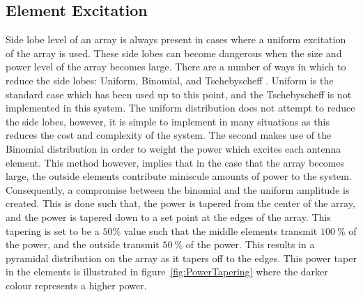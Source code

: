 \documentclass[11pt]{witseiepaper}
\begin{document}
\subsection{Element Excitation} \label{sec:ElementExcitation}
Side lobe level of an array is always present in cases where a uniform excitation of the array is used. These side lobes can become dangerous when the size and power level of the array becomes large.
There are a number of ways in which to reduce the side lobes: Uniform, Binomial, and Tschebyscheff \cite[p.~324-325]{Balanis}. Uniform is the standard case which has been used up to this point, and the Tschebyscheff is not implemented in this system. The uniform distribution does not attempt to reduce the side lobes, however, it is simple to implement in many situations as this reduces the cost and complexity of the system.
The second makes use of the Binomial distribution in order to weight the power which excites each antenna element.
This method however, implies that in the case that the array becomes large, the outside elements contribute miniscule amounts of power to the system.
Consequently, a compromise between the binomial and the uniform amplitude is created.
This is done such that, the power is tapered from the center of the array, and the power is tapered down to a set point at the edges of the array. This tapering is set to be a $50 \%$ value such that the middle elements transmit $100~\%$ of the power, and the outside transmit $50~\%$ of the power. This results in a pyramidal distribution on the array as it tapers off to the edges.
This power taper in the elements is illustrated in figure~\ref{fig:PowerTapering} where the darker colour represents a higher power.
\end{document}
